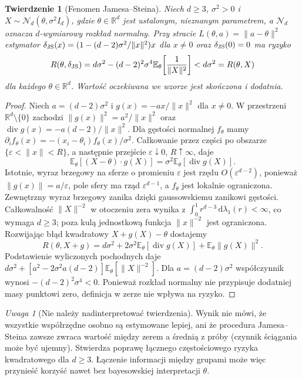 \documentclass[11pt,a4paper,oneside]{report}
\numberwithin{equation}{chapter}
\theoremstyle{plain}
\newtheorem{twierdzenie}{Twierdzenie}[chapter]
\theoremstyle{definition}
\theoremstyle{remark}
\newtheorem{uwaga}{Uwaga}[chapter]
\newcommand{\R}{\mathbb R}
\newcommand{\E}{\mathbb E}
\newcommand{\dd}{\mathrm d}
\newcommand{\norm}[1]{\lVert#1\rVert}
\newcommand{\Normal}{\mathcal N}
\begin{document}
\begin{twierdzenie}[Fenomen Jamesa--Steina]
\label{thm:james-stein}
Niech $d\ge3$, $\sigma^2>0$ i
$X\sim\Normal_d(\theta,\sigma^2 I_d)$, gdzie
$\theta\in\R^d$ jest ustalonym, nieznanym parametrem,
a $\Normal_d$ oznacza $d$-wymiarowy rozkład normalny.
Przy stracie $L(\theta,a)=\norm{a-\theta}^2$ estymator
$\delta_{\rm JS}(x)=(1-(d-2)\sigma^2/\norm{x}^2)x$
dla $x\ne0$ oraz $\delta_{\rm JS}(0)=0$ ma ryzyko
\[
 R(\theta,\delta_{\rm JS})
 =d\sigma^2-(d-2)^2\sigma^4
   \E_\theta\!\left[\frac1{\norm{X}^2}\right]
 <d\sigma^2=R(\theta,X)
\]
dla \emph{każdego} $\theta\in\R^d$.
Wartość oczekiwana we wzorze jest skończona i dodatnia.
\end{twierdzenie}
\begin{proof}
Niech $a=(d-2)\sigma^2$ i
$g(x)=-ax/\norm{x}^2$ dla $x\ne0$.
W przestrzeni $\R^d\setminus\{0\}$ zachodzi
$\norm{g(x)}^2=a^2/\norm{x}^2$ oraz
$\operatorname{div}g(x)=-a(d-2)/\norm{x}^2$.
Dla gęstości normalnej $f_\theta$ mamy
$\partial_i f_\theta(x)=-(x_i-\theta_i)f_\theta(x)/\sigma^2$.
Całkowanie przez części po obszarze
$\{\varepsilon<\norm{x}<R\}$, a następnie przejście
$\varepsilon\downarrow0$, $R\uparrow\infty$, daje
\[
 \E_\theta[(X-\theta)\cdot g(X)]
   =\sigma^2\E_\theta[\operatorname{div}g(X)].
\]
Istotnie, wyraz brzegowy na sferze o promieniu
$\varepsilon$ jest rzędu $O(\varepsilon^{d-2})$,
ponieważ $\norm{g(x)}=a/\varepsilon$, pole sfery ma
rząd $\varepsilon^{d-1}$, a $f_\theta$ jest lokalnie
ograniczona. Zewnętrzny wyraz brzegowy zanika dzięki
gaussowskiemu zanikowi gęstości.
Całkowalność $\norm{X}^{-2}$ w otoczeniu zera
wynika z $\int_0^1r^{d-3}\,\dd\lambda_1(r)<\infty$,
co wymaga $d\ge3$; poza kulą jednostkową funkcja
$\norm{x}^{-2}$ jest ograniczona.
Rozwijając błąd kwadratowy $X+g(X)-\theta$ dostajemy
\[
 R(\theta,X+g)=d\sigma^2
   +2\sigma^2\E_\theta[\operatorname{div}g(X)]
   +\E_\theta\norm{g(X)}^2.
\]
Podstawienie wyliczonych pochodnych daje
$d\sigma^2+[a^2-2\sigma^2a(d-2)]\E_\theta[\norm{X}^{-2}]$.
Dla $a=(d-2)\sigma^2$ współczynnik wynosi
$-(d-2)^2\sigma^4<0$. Ponieważ rozkład normalny nie
przypisuje dodatniej masy punktowi zero, definicja w zerze
nie wpływa na ryzyko.
\end{proof}

\begin{uwaga}[Nie należy nadinterpretować twierdzenia]
Wynik nie mówi, że wszystkie współrzędne osobno są
estymowane lepiej, ani że procedura Jamesa--Steina zawsze
zwraca wartość między zerem a średnią z próby (czynnik
ściągania może być ujemny). Stwierdza poprawę łącznego
częstościowego ryzyka kwadratowego dla $d\ge3$.
Łączenie informacji między grupami może więc przynieść
korzyść nawet bez bayesowskiej interpretacji $\theta$.
\end{uwaga}
\end{document}
